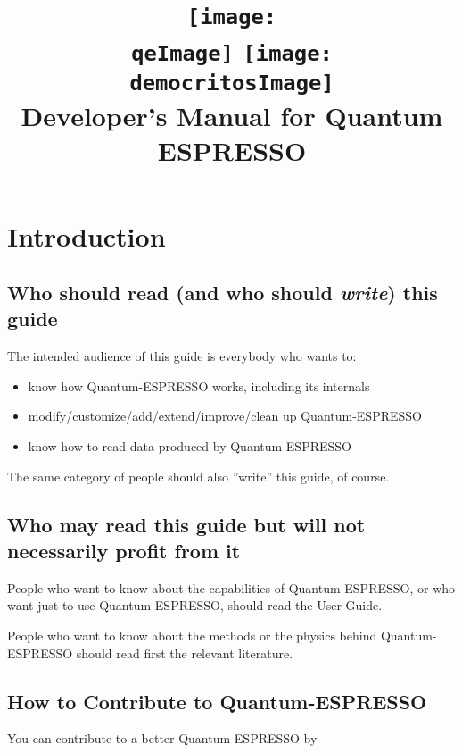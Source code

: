 \documentclass[12pt,a4paper]{article}
\def\qe{{\sc Quantum ESPRESSO}}
\def\qeImage{quantum_espresso.pdf}
\def\democritosImage{democritos.pdf}
\def\qeImage{quantum_espresso.png}
\def\democritosImage{democritos.png}
\begin{document}
 
\author{}
\date{}
\title{
  \texttt{[image: \\qeImage]} \hskip 2cm
  \texttt{[image: \\democritosImage]}\\
  \vskip 1cm
  \Huge Developer's Manual for \qe \smallskip
}
\maketitle

\tableofcontents

\section{Introduction}
\subsection{Who should read (and who should {\em write}) this guide}

The intended audience of this guide is everybody who wants to:
\begin{itemize}
\item know how Quantum-ESPRESSO works, including its internals
\item modify/customize/add/extend/improve/clean up Quantum-ESPRESSO
\item know how to read data produced by Quantum-ESPRESSO
\end{itemize}
The same category of people should also ''write'' this guide, of course.

\subsection{Who may read this guide but will not necessarily profit from it}

People who want to know about the capabilities of Quantum-ESPRESSO,
or who want just to use Quantum-ESPRESSO, should read the 
User Guide.

People who want to know about the methods or the physics
behind Quantum-ESPRESSO should read first the relevant  
literature.

\subsection{How to Contribute to Quantum-ESPRESSO}

You can contribute to a better Quantum-ESPRESSO by
\end{document}

